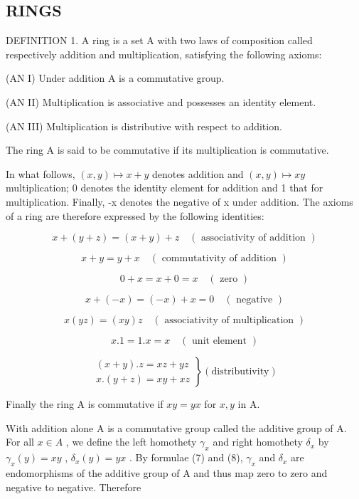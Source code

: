 \subsection{RINGS}

DEFINITION 1. A ring is a set A with two laws of composition called respectively addition and multiplication, satisfying the following axioms:

(AN I) Under addition A is a commutative group.

(AN II) Multiplication is associative and possesses an identity element.

(AN III) Multiplication is distributive with respect to addition.

The ring A is said to be commutative if its multiplication is commutative.

In what follows, \((x,y)\mapsto x+y\) denotes addition and \((x,y)\mapsto xy\) multiplication; 0 denotes the identity element for addition and 1 that for multiplication. Finally, -x denotes the negative of x under addition. The axioms of a ring are therefore expressed by the following identities:

\[
x + (y + z) = (x + y) + z \quad (\text { associativity   of   addition })\tag{1}
\]

\[
x + y = y + x \quad (\text { commutativity   of   addition })\tag{2}
\]

\[
0 + x = x + 0 = x \quad (\text { zero })\tag{3}
\]

\[
x + (- x) = (- x) + x = 0 \quad (\text { negative })\tag{4}
\]

\[
x (y z) = (x y) z \quad (\text { associativity   of   multiplication })\tag{5}
\]

\[
x. 1 = 1. x = x \quad (\text { unit   element })\tag{6}
\]

\[
\left. \begin{array}{l} (x + y). z = x z + y z \\ x. (y + z) = x y + x z \end{array} \right\} (\text {distributivity})\tag{7, 8}
\]

Finally the ring A is commutative if \(xy = yx\) for \(x, y\) in A.

With addition alone A is a commutative group called the additive group of A. For all \(x \in A\) , we define the left homothety \(\gamma_{x}\) and right homothety \(\delta_{x}\) by \(\gamma_{x}(y) = xy\) , \(\delta_{x}(y) = yx\) . By formulae (7) and (8), \(\gamma_{x}\) and \(\delta_{x}\) are endomorphisms of the additive group of A and thus map zero to zero and negative to negative. Therefore

